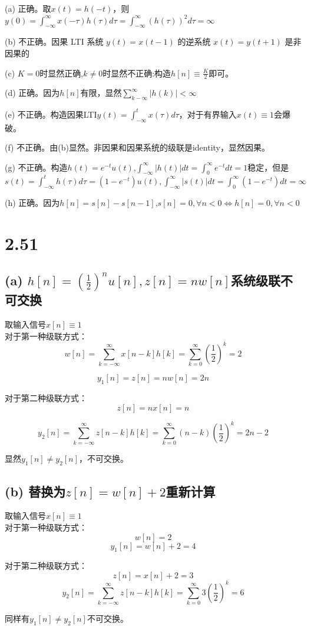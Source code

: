 \documentclass[UTF8, fontset=fandol,12pt, a4paper]{ctexart}
\begin{document}
\noindent (a) 正确。取$x(t)=h(-t)$，则$y(0)=\int_{-\infty}^{\infty}x(-\tau)h(\tau)d\tau=\int_{-\infty}^{\infty}(h(\tau))^2d\tau=\infty$

\noindent (b) 不正确。因果 LTI 系统 $y(t)=x(t-1)$ 的逆系统 $x(t)=y(t+1)$ 是非因果的

\noindent (c) $K=0$时显然正确,$k\ne0$时显然不正确:构造$h[n] \equiv \frac{K}{2}$即可。

\noindent (d) 正确。因为$h[n]$有限，显然$\sum_{k-\infty}^{\infty}|h(k)|<\infty$

\noindent (e) 不正确。构造因果LTI$y(t)=\int_{-\infty}^{t}x(\tau)d\tau$，对于有界输入$x(t)\equiv 1$会爆破。

\noindent (f) 不正确。由(b)显然。非因果和因果系统的级联是identity，显然因果。

\noindent (g) 不正确。构造$h(t)=e^{-t}u(t)$,$\int_{-\infty}^{\infty}|h(t)|dt=\int_{0}^{\infty}e^{-t}dt=1$稳定，但是$s(t)=\int_{-\infty}^{t}h(\tau)d\tau=(1-e^{-t})u(t), \int_{-\infty}^{\infty}|s(t)|dt=\int_{0}^{\infty}(1-e^{-t})dt=\infty$

\noindent (h) 正确。因为$h[n]=s[n]-s[n-1]$,$s[n]=0,\forall n<0 \Leftrightarrow h[n]=0,\forall n<0$

\section* {2.51}
\subsection* {(a) $h[n]=(\frac{1}{2})^nu[n],z[n]=nw[n]$系统级联不可交换}

\noindent 取输入信号$x[n] \equiv 1$ \\
对于第一种级联方式：
\[
  w[n]=\sum_{k=-\infty}^{\infty}x[n-k]h[k]=\sum_{k=0}^{\infty}(\frac{1}{2})^k=2 
\]

$$y_1[n]=z[n]=nw[n]=2n$$

\noindent 对于第二种级联方式：
$$z[n]=nx[n]=n$$

\[
  y_2[n]=\sum_{k=-\infty}^{\infty}z[n-k]h[k]=\sum_{k=0}^{\infty}(n-k)(\frac{1}{2})^k=2n-2
\]

\noindent 显然$y_1[n]\ne y_2[n]$，不可交换。

\subsection* {(b) 替换为$z[n]=w[n]+2$重新计算}

\noindent 取输入信号$x[n] \equiv 1$ \\
对于第一种级联方式：
$$w[n]=2$$
$$y_1[n]=w[n]+2=4$$

\noindent 对于第二种级联方式：
$$z[n]=x[n]+2=3$$
\[
  y_2[n]=\sum_{k=-\infty}^{\infty}z[n-k]h[k]=\sum_{k=0}^{\infty}3(\frac{1}{2})^k=6
\]

\noindent 同样有$y_1[n]\ne y_2[n]$不可交换。
\end{document}
